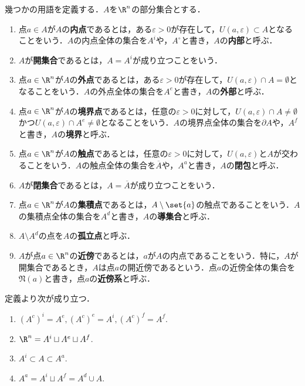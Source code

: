 \documentclass[a4paper,10pt]{ltjsarticle}
\begin{document}
幾つかの用語を定義する．\(A\)を\(\R^n\)の部分集合とする．
\begin{enumerate}
  \item 点\(a\in A\)が\(A\)の\textbf{内点}であるとは，ある\(\varepsilon > 0\)が存在して，\(U(a, \varepsilon) \subset A\)となることをいう．\(A\)の内点全体の集合を\(A^i\)や，\(A^\circ\)と書き，\(A\)の\textbf{内部}と呼ぶ．
  \item \(A\)が\textbf{開集合}であるとは，\(A = A^i\)が成り立つことをいう．
  \item 点\(a\in \R^n\)が\(A\)の\textbf{外点}であるとは，ある\(\varepsilon > 0\)が存在して，\(U(a, \varepsilon) \cap A = \emptyset\)となることをいう．\(A\)の外点全体の集合を\(A^e\)と書き，\(A\)の\textbf{外部}と呼ぶ．
  \item 点\(a\in\R^n\)が\(A\)の\textbf{境界点}であるとは，任意の\(\varepsilon > 0\)に対して，\(U(a, \varepsilon)\cap A \ne \emptyset\)かつ\(U(a, \varepsilon)\cap A^e \ne \emptyset\)となることをいう．\(A\)の境界点全体の集合を\(\partial A\)や，\(A^f\)と書き，\(A\)の\textbf{境界}と呼ぶ．
  \item 点\(a\in\R^n\)が\(A\)の\textbf{触点}であるとは，任意の\(\varepsilon > 0\)に対して，\(U(a, \varepsilon)\)と\(A\)が交わることをいう．\(A\)の触点全体の集合を\(\overline A\)や，\(A^a\)と書き，\(A\)の\textbf{閉包}と呼ぶ．
  \item \(A\)が\textbf{閉集合}であるとは，\(A = \overline A\)が成り立つことをいう．
  \item 点\(a \in \R^n\)が\(A\)の\textbf{集積点}であるとは，\(A\setminus\set{a}\)の触点であることをいう．\(A\)の集積点全体の集合を\(A^d\)と書き，\(A\)の\textbf{導集合}と呼ぶ．
  \item \(A \setminus A^d\)の点を\(A\)の\textbf{孤立点}と呼ぶ．
  \item \(A\)が点\(a \in \R^n\)の\textbf{近傍}であるとは，\(a\)が\(A\)の内点であることをいう．特に，\(A\)が開集合であるとき，\(A\)は点\(a\)の開近傍であるという．点\(a\)の近傍全体の集合を\(\mathfrak{N}(a)\)と書き，点\(a\)の\textbf{近傍系}と呼ぶ．
\end{enumerate}
定義より次が成り立つ．
\begin{enumerate}
  \item \((A^c)^i = A^e, (A^c)^e = A^i, (A^c)^f = A^f\).
  \item \(\R^n = A^i \sqcup A^e \sqcup A^f\).
  \item \(A^i \subset A \subset A^a\).
  \item \(A^a = A^i \sqcup A^f = A^d \cup A\).
\end{enumerate}
\end{document}
